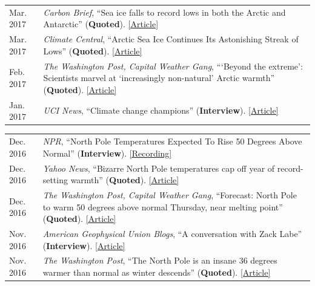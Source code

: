 \documentclass[margin,line,palatino,courier,10pt]{res}
\begin{document}
\begin{resume}
\begin{tabular}{@{}p{0.9in}p{4in}}
Mar. 2017 & \textit{Carbon Brief}, ``Sea ice falls to record lows in both the Arctic and Antarctic'' (\textbf{Quoted}). \href{https://www.carbonbrief.org/sea-ice-falls-record-lows-arctic-antarctic}{[Article]}\\
Mar. 2017 & \textit{Climate Central}, ``Arctic Sea Ice Continues Its Astonishing Streak of Lows'' (\textbf{Quoted}). \href{http://www.climatecentral.org/news/arctic-sea-ice-record-low-streak-21227}{[Article]}\\
Feb. 2017 & \textit{The Washington Post, Capital Weather Gang}, ```Beyond the extreme': Scientists marvel at `increasingly non-natural' Arctic warmth'' (\textbf{Quoted}). \href{https://www.washingtonpost.com/news/capital-weather-gang/wp/2017/02/01/beyond-the-extreme-scientists-marvel-at-increasingly-non-natural-arctic-warmth/?sdfsdfsdfsdfsd&utm_term=.cf3cf81d24f3}{[Article]}\\
Jan. 2017 & \textit{UCI News}, ``Climate change champions'' (\textbf{Interview}). \href{https://news.uci.edu/climate-change-champions/}{[Article]}\\
\end{tabular}
\begin{tabular}{@{}p{0.9in}p{4in}}
Dec. 2016 & \textit{NPR}, ``North Pole Temperatures Expected To Rise 50 Degrees Above Normal'' (\textbf{Interview}). \href{http://www.npr.org/2016/12/21/506483966/north-pole-temperatures-expected-to-rise-50-degrees-above-normal}{[Recording]}\\
Dec. 2016 & \textit{Yahoo News}, ``Bizarre North Pole temperatures cap off year of record-setting warmth'' (\textbf{Quoted}). \href{https://www.yahoo.com/news/bizarre-north-pole-temperatures-cap-off-year-of-record-setting-warmth-181727978.html?soc_src=social-sh&soc_trk=tw}{[Article]}\\
Dec. 2016 & \textit{The Washington Post, Capital Weather Gang}, ``Forecast: North Pole to warm 50 degrees above normal Thursday, near melting point'' (\textbf{Quoted}). \href{https://www.washingtonpost.com/news/capital-weather-gang/wp/2016/12/20/forecast-north-pole-to-warm-50-degrees-above-normal-thursday-near-melting-point/?dfgdfgdfgdfg&utm_term=.e648369ada7e}{[Article]}\\
Nov. 2016 & \textit{American Geophysical Union Blogs}, ``A conversation with Zack Labe'' (\textbf{Interview}). \href{http://blogs.agu.org/mountainbeltway/2016/11/23/conversation-zack-labe/}{[Article]}\\
Nov. 2016 & \textit{The Washington Post}, ``The North Pole is an insane 36 degrees warmer than normal as winter descends'' (\textbf{Quoted}). \href{https://www.washingtonpost.com/news/energy-environment/wp/2016/11/17/the-north-pole-is-an-insane-36-degrees-warmer-than-normal-as-winter-descends/?utm_term=.f2cb9596b3d8}{[Article]}\\

\end{tabular}
\end{resume}
\end{document}

